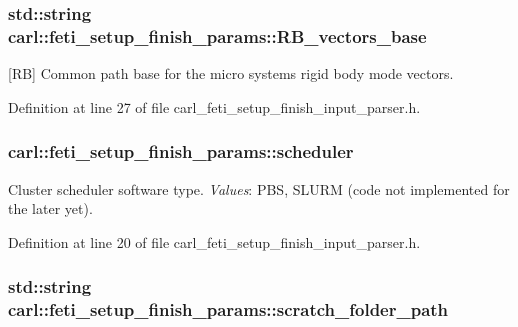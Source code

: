 \subsubsection[{R\+B\+\_\+vectors\+\_\+base}]{\setlength{\rightskip}{0pt plus 5cm}std\+::string carl\+::feti\+\_\+setup\+\_\+finish\+\_\+params\+::\+R\+B\+\_\+vectors\+\_\+base}\label{structcarl_1_1feti__setup__finish__params_aebec4649657ad7602a20111ffdb01e06}


\mbox{[}R\+B\mbox{]} Common path base for the micro system\textquotesingle{}s rigid body mode vectors. 



Definition at line 27 of file carl\+\_\+feti\+\_\+setup\+\_\+finish\+\_\+input\+\_\+parser.\+h.

\hypertarget{structcarl_1_1feti__setup__finish__params_a30e2fbb1ab52dbbce37968be8e6f95b1}{}
\subsubsection[{scheduler}]{ carl\+::feti\+\_\+setup\+\_\+finish\+\_\+params\+::scheduler}\label{structcarl_1_1feti__setup__finish__params_a30e2fbb1ab52dbbce37968be8e6f95b1}


Cluster scheduler software type. {\itshape Values}\+: P\+B\+S, S\+L\+U\+R\+M (code not implemented for the later yet). 



Definition at line 20 of file carl\+\_\+feti\+\_\+setup\+\_\+finish\+\_\+input\+\_\+parser.\+h.

\hypertarget{structcarl_1_1feti__setup__finish__params_ac8490d7133284997e9497f13c75ed1bd}{}
\subsubsection[{scratch\+\_\+folder\+\_\+path}]{\setlength{\rightskip}{0pt plus 5cm}std\+::string carl\+::feti\+\_\+setup\+\_\+finish\+\_\+params\+::scratch\+\_\+folder\+\_\+path}\label{structcarl_1_1feti__setup__finish__params_ac8490d7133284997e9497f13c75ed1bd}


